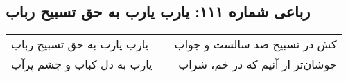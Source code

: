 \begin{center}
\section*{رباعی شماره ۱۱۱: یارب یارب به حق تسبیح رباب}
\label{sec:0111}
\begin{longtable}{l p{0.5cm} r}
یارب یارب به حق تسبیح رباب
&&
کش در تسبیح صد سالست و جواب
\\
یارب به دل کباب و چشم پرآب
&&
جوشان‌تر از آنیم که در خم، شراب
\\
\end{longtable}
\end{center}
